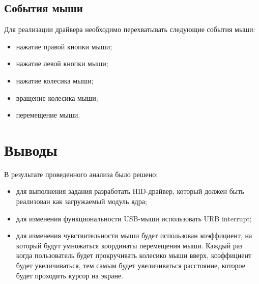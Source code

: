 \subsection{События мыши}

Для реализации драйвера необходимо перехватывать следующие события мыши:

\begin{itemize}[label=---]
	\item нажатие правой кнопки мыши;
	\item нажатие левой кнопки мыши;
	\item нажатие колесика мыши;
	\item вращение колесика мыши;
	\item перемещение мыши.
\end{itemize}

\section*{Выводы}

В результате проведенного анализа было решено:
\begin{itemize}[label=---]
	\item для выполнения задания разработать HID-драйвер, который должен быть реализован как загружаемый модуль ядра;
	\item для изменения функциональности USB-мыши использовать URB interrupt;
	\item для изменения чувствительности мыши будет использован коэффициент, на который будут умножаться координаты перемещения мыши. Каждый раз когда пользователь будет прокручивать колесико мыши вверх, коэффициент будет увеличиваться, тем самым будет увеличиваться расстояние, которое будет проходить курсор на экране.
\end{itemize}
